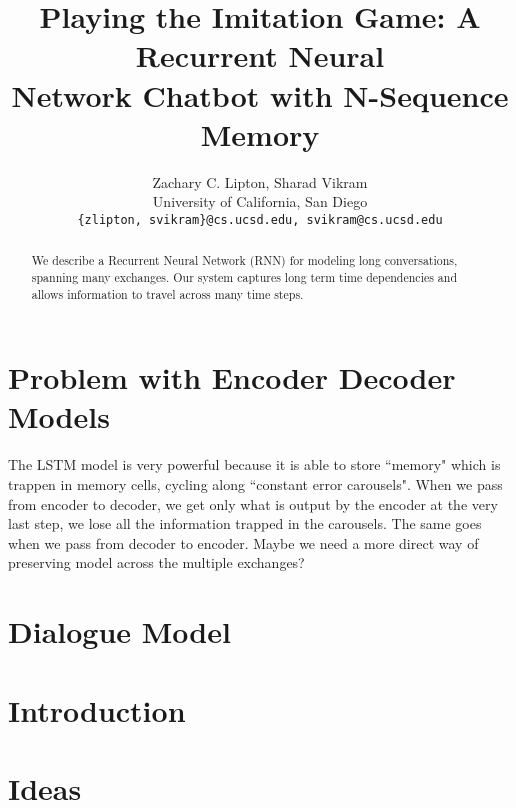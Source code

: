 \documentclass[]{article}
\begin{document}
\title{Playing the Imitation Game:  A Recurrent Neural \\
 Network Chatbot with N-Sequence Memory}

\author{Zachary C. Lipton, Sharad Vikram\\
University of California, San Diego\\
\texttt{\{zlipton, svikram\}@cs.ucsd.edu, svikram@cs.ucsd.edu}
}

\begin{abstract}
We describe a Recurrent Neural Network (RNN) for modeling long conversations, spanning many exchanges. Our system captures long term time dependencies and allows information to travel across many time steps.
\end{abstract}


\section{Problem with Encoder Decoder Models}
The LSTM model is very powerful because it is able to store ``memory" which is trappen in memory cells, cycling along ``constant error carousels". When we pass from encoder to decoder, we get only what is output by the encoder at the very last step, we lose all the information trapped in the carousels. The same goes when we pass from decoder to encoder. Maybe we need a more direct way of preserving model across the multiple exchanges?


\section{Dialogue Model}




\section{Introduction}
\section{Ideas}
\end{document}
